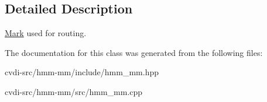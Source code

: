 \subsection{Detailed Description}
\hyperlink{classhmm__mm_1_1Mark}{Mark} used for routing. 

The documentation for this class was generated from the following files\+:\begin{DoxyCompactItemize}
\item 
cvdi-\/src/hmm-\/mm/include/hmm\+\_\+mm.\+hpp\item 
cvdi-\/src/hmm-\/mm/src/hmm\+\_\+mm.\+cpp\end{DoxyCompactItemize}
